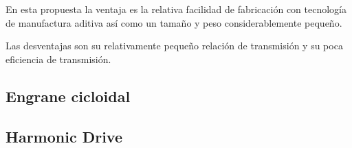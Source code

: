 En esta propuesta la ventaja es la relativa facilidad de fabricación con tecnología de manufactura aditiva así como un tamaño y peso considerablemente pequeño.

Las desventajas son su relativamente pequeño relación de transmisión y su poca eficiencia de transmisión.

\subsection{Engrane cicloidal}
\subsection{Harmonic Drive}

  
